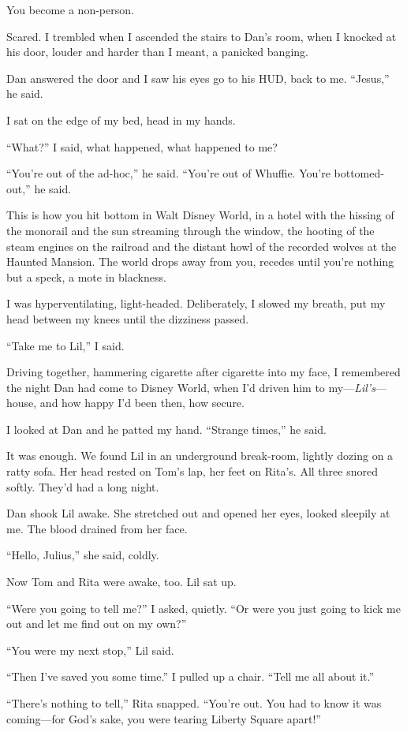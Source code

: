 You become a non-person.

Scared. I trembled when I ascended the stairs to Dan's room, when I
knocked at his door, louder and harder than I meant, a panicked
banging.

Dan answered the door and I saw his eyes go to his HUD, back to me.
“Jesus,” he said.

I sat on the edge of my bed, head in my hands.

“What?” I said, what happened, what happened to me?

“You're out of the ad-hoc,” he said. “You're out of Whuffie. You're
bottomed-out,” he said.

This is how you hit bottom in Walt Disney World, in a hotel with
the hissing of the monorail and the sun streaming through the
window, the hooting of the steam engines on the railroad and the
distant howl of the recorded wolves at the Haunted Mansion. The
world drops away from you, recedes until you're nothing but a
speck, a mote in blackness.

I was hyperventilating, light-headed. Deliberately, I slowed my
breath, put my head between my knees until the dizziness passed.

“Take me to Lil,” I said.

Driving together, hammering cigarette after cigarette into my face,
I remembered the night Dan had come to Disney World, when I'd
driven him to my—\emph{Lil's}—house, and how happy I'd been then,
how secure.

I looked at Dan and he patted my hand. “Strange times,” he said.

It was enough. We found Lil in an underground break-room, lightly
dozing on a ratty sofa. Her head rested on Tom's lap, her feet on
Rita's. All three snored softly. They'd had a long night.

Dan shook Lil awake. She stretched out and opened her eyes, looked
sleepily at me. The blood drained from her face.

“Hello, Julius,” she said, coldly.

Now Tom and Rita were awake, too. Lil sat up.

“Were you going to tell me?” I asked, quietly. “Or were you just
going to kick me out and let me find out on my own?”

“You were my next stop,” Lil said.

“Then I've saved you some time.” I pulled up a chair. “Tell me all
about it.”

“There's nothing to tell,” Rita snapped. “You're out. You had to
know it was coming—for God's sake, you were tearing Liberty Square
apart!”

